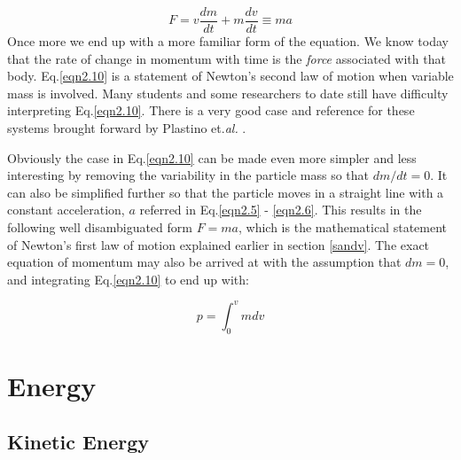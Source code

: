 \begin{equation}
F = v\frac{dm}{dt}+ m\frac{dv}{dt}\equiv ma
\label{eqn2.10}
\end{equation} 
\newpage
\noindent Once more we end up with a more familiar form of the equation. We know today that the rate of change in momentum with time is the \emph{force} associated with that body. Eq.\eqref{eqn2.10} is a statement of Newton's second law of motion when variable mass is involved. Many students and some researchers to date still have difficulty interpreting Eq.\eqref{eqn2.10}. There is a very good case and reference for these systems brought forward by Plastino et.\emph{al.} \cite{plastino1992}.

\noindent Obviously the case in Eq.\eqref{eqn2.10} can be made even more simpler and less interesting by removing the variability in the particle mass so that $dm/dt =0$. It can also be simplified further so that the particle moves in a straight line with a constant acceleration, $a$ referred in Eq.\eqref{eqn2.5} - \eqref{eqn2.6}. This results in the following well disambiguated form $F = ma$, which is the mathematical statement of Newton's first law of motion explained earlier in section \ref{sandv}. The exact equation of momentum may also be arrived at with the assumption that $dm =0$, and integrating Eq.\eqref{eqn2.10} to end up with:

\begin{equation}
p = \int_{0}^{v}mdv
\label{eqn2.11}
\end{equation}  

\section{Energy}

\subsection{Kinetic Energy}

